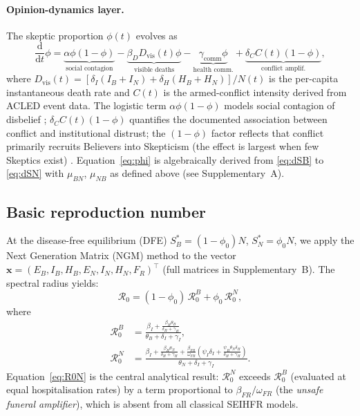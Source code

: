 \documentclass[12pt,a4paper]{article}
\newcommand{\ddt}{\dfrac{\mathrm{d}}{\mathrm{d}t}}
\newcommand{\SB}{S_{\!B}}\newcommand{\EB}{E_{\!B}}
\newcommand{\IB}{I_{\!B}}\newcommand{\HB}{H_{\!B}}\newcommand{\RB}{R_{\!B}}
\newcommand{\SN}{S_{\!N}}\newcommand{\EN}{E_{\!N}}
\newcommand{\IN}{I_{\!N}}\newcommand{\HN}{H_{\!N}}\newcommand{\RN}{R_{\!N}}
\begin{document}
\paragraph{Opinion-dynamics layer.}
The skeptic proportion $\phi(t)$ evolves as
\begin{equation}
  \ddt\phi =
    \underbrace{\alpha\phi(1-\phi)}_{\text{social contagion}}
  - \underbrace{\beta_D D_{\text{vis}}(t)\phi}_{\text{visible deaths}}
  - \underbrace{\gamma_{\text{comm}}\phi}_{\text{health comm.}}
  + \underbrace{\delta_C C(t)(1-\phi)}_{\text{conflict amplif.}},
  \label{eq:phi}
\end{equation}
where
$D_{\text{vis}}(t) = [\delta_I(\IB+\IN) + \delta_H(\HB+\HN)]/N(t)$
is the per-capita instantaneous death rate and $C(t)$ is the
armed-conflict intensity derived from ACLED event data. The logistic
term $\alpha\phi(1-\phi)$ models social contagion of disbelief
\citep{Cinelli2020}; $\delta_C C(t)(1-\phi)$ quantifies the documented
association between conflict and institutional distrust; the $(1-\phi)$ factor reflects that conflict primarily recruits Believers into Skepticism (the effect is largest when few Skeptics exist)
\citep{Gayer2007,Larson2020}.
Equation~\eqref{eq:phi} is algebraically derived from
\eqref{eq:dSB} to \eqref{eq:dSN} with $\mu_{BN}$, $\mu_{NB}$ as defined
above (see Supplementary~A).

\subsection{Basic reproduction number}

At the disease-free equilibrium (DFE) $\SB^{*}=(1-\phi_0)N$,
$\SN^{*}=\phi_0 N$, we apply the Next Generation Matrix (NGM) method
\citep{vandenDriessche2002} to the vector
$\mathbf{x}=(E_B,I_B,H_B,E_N,I_N,H_N,F_R)^\top$
(full matrices in Supplementary~B). The spectral radius yields:
\begin{equation}
  \mathcal{R}_0 = (1-\phi_0)\,\mathcal{R}_0^B + \phi_0\,\mathcal{R}_0^N,
  \label{eq:R0}
\end{equation}
where
\begin{align}
  \mathcal{R}_0^B &=
    \frac{\displaystyle\beta_I
      + \frac{\beta_H\theta_B}{\delta_H+\gamma_H}}
    {\theta_B + \delta_I + \gamma_I},
  \label{eq:R0B}\\[10pt]
  \mathcal{R}_0^N &=
    \frac{\displaystyle\beta_I
      + \frac{\beta_H\theta_N}{\delta_H+\gamma_H}
      + \frac{\beta_{FR}}{\omega_{FR}}\!\left(
          \psi_I\delta_I
          + \frac{\psi_H\theta_N\delta_H}{\delta_H+\gamma_H}\right)}
    {\theta_N + \delta_I + \gamma_I}.
  \label{eq:R0N}
\end{align}
Equation~\eqref{eq:R0N} is the central analytical result: $\mathcal{R}_0^N$
exceeds $\mathcal{R}_0^B$ (evaluated at equal hospitalisation rates) by a
term proportional to $\beta_{FR}/\omega_{FR}$ (the \emph{unsafe funeral amplifier}), which is absent from all classical SEIHFR models.
\end{document}
